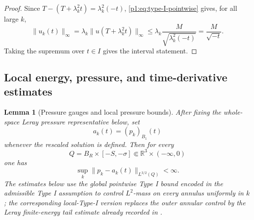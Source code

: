 \documentclass[11pt]{amsart}
\theoremstyle{plain}
\newtheorem{lemma}[lemma]{Lemma}
\theoremstyle{definition}
\theoremstyle{remark}
\numberwithin{equation}{section}
\newcommand{\R}{\mathbb R}
\begin{document}
\begin{proof}
Since \(T-(T+\lambda_k^2t)=\lambda_k^2(-t)\), \eqref{p1:eq:type-I-pointwise}
gives, for all large \(k\),
\[
   \|u_k(t)\|_\infty
   =
   \lambda_k\|u(T+\lambda_k^2t)\|_\infty
   \le
   \lambda_k\frac{M}{\sqrt{\lambda_k^2(-t)}}
   =
   \frac{M}{\sqrt{-t}}.
\]
Taking the supremum over \(t\in I\) gives the interval statement.
\end{proof}

\subsection{Local energy, pressure, and time-derivative estimates}

\begin{lemma}[Pressure gauges and local pressure bounds]\label{p1:lem:pressure}
After fixing the whole-space Leray pressure representative below, set
\[
   a_k(t)=(p_k)_{B_1}(t)
\]
whenever the rescaled solution is defined.  Then for every
\[
   Q=B_R\times[-S,-\sigma]\Subset\R^3\times(-\infty,0)
\]
one has
\[
   \sup_k\|p_k-a_k(t)\|_{L^{3/2}(Q)}<\infty .
\]
The estimates below use the global pointwise Type I bound encoded in the
admissible Type I assumption  to control
\(L^2\)-mass on every annulus uniformly in \(k\); the corresponding
local-Type-I version replaces the outer annular control by the Leray
finite-energy tail estimate already recorded in
.
\end{lemma}
\end{document}
